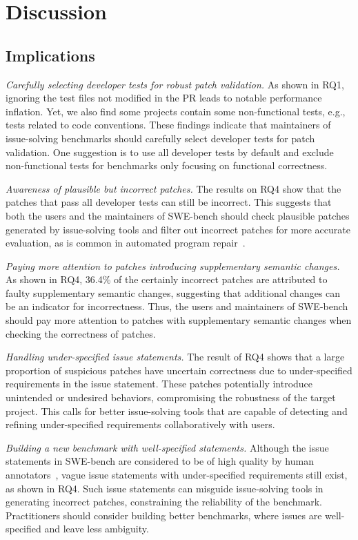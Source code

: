 \section{Discussion}

\subsection{Implications}
\textit{Carefully selecting developer tests for robust patch validation.} As shown in RQ1, ignoring the test files not modified in the PR leads to notable performance inflation.
Yet, we also find some projects contain some non-functional tests, e.g., tests related to code conventions.
These findings indicate that maintainers of issue-solving benchmarks should carefully select developer tests for patch validation.
One suggestion is to use all developer tests by default and exclude non-functional tests for benchmarks only focusing on functional correctness.

\textit{Awareness of plausible but incorrect patches.} The results on RQ4 show that the patches that pass all developer tests can still be incorrect. This suggests that both the users and the maintainers of SWE-bench should check plausible patches generated by issue-solving tools and filter out incorrect patches for more accurate evaluation, as is common in automated program repair~\cite{cacm2019-program-repair}.

\textit{Paying more attention to patches introducing supplementary semantic changes.}
As shown in RQ4, 36.4\% of the certainly incorrect patches are attributed to faulty supplementary semantic changes, suggesting that additional changes can be an indicator for incorrectness. Thus, the users and maintainers of SWE-bench should pay more attention to patches with supplementary semantic changes when checking the correctness of patches.

\textit{Handling under-specified issue statements.}
The result of RQ4 shows that a large proportion of suspicious patches have uncertain correctness due to under-specified requirements in the issue statement.
These patches potentially introduce unintended or undesired behaviors, compromising the robustness of the target project. 
This calls for better issue-solving tools that are capable of detecting and refining under-specified requirements collaboratively with users.

\textit{Building a new benchmark with well-specified statements.}
Although the issue statements in SWE-bench are considered to be of high quality by human annotators~\cite{swebenchverified}, vague issue statements with under-specified requirements still exist, as shown in RQ4.
Such issue statements can misguide issue-solving tools in generating incorrect patches, constraining the reliability of the benchmark. 
Practitioners should consider building better benchmarks, where issues are well-specified and leave less ambiguity.










